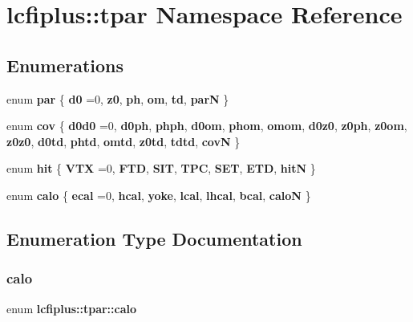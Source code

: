 \section{lcfiplus\+:\+:tpar Namespace Reference}
\label{namespacelcfiplus_1_1tpar}
\subsection*{Enumerations}
\begin{DoxyCompactItemize}
\item 
enum \textbf{ par} \{ \newline
\textbf{ d0} =0, 
\textbf{ z0}, 
\textbf{ ph}, 
\textbf{ om}, 
\newline
\textbf{ td}, 
\textbf{ parN}
 \}
\item 
enum \textbf{ cov} \{ \newline
\textbf{ d0d0} =0, 
\textbf{ d0ph}, 
\textbf{ phph}, 
\textbf{ d0om}, 
\newline
\textbf{ phom}, 
\textbf{ omom}, 
\textbf{ d0z0}, 
\textbf{ z0ph}, 
\newline
\textbf{ z0om}, 
\textbf{ z0z0}, 
\textbf{ d0td}, 
\textbf{ phtd}, 
\newline
\textbf{ omtd}, 
\textbf{ z0td}, 
\textbf{ tdtd}, 
\textbf{ covN}
 \}
\item 
enum \textbf{ hit} \{ \newline
\textbf{ V\+TX} =0, 
\textbf{ F\+TD}, 
\textbf{ S\+IT}, 
\textbf{ T\+PC}, 
\newline
\textbf{ S\+ET}, 
\textbf{ E\+TD}, 
\textbf{ hitN}
 \}
\item 
enum \textbf{ calo} \{ \newline
\textbf{ ecal} =0, 
\textbf{ hcal}, 
\textbf{ yoke}, 
\textbf{ lcal}, 
\newline
\textbf{ lhcal}, 
\textbf{ bcal}, 
\textbf{ caloN}
 \}
\end{DoxyCompactItemize}


\subsection{Enumeration Type Documentation}
\mbox{\label{namespacelcfiplus_1_1tpar_abf1dbff1c8ed52d84bab9db2c3d80253}} 
\subsubsection{calo}
{\footnotesize\ttfamily enum \textbf{ lcfiplus\+::tpar\+::calo}}


